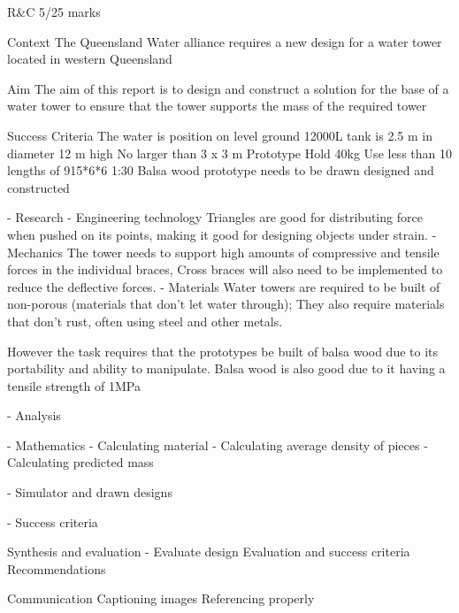 \documentclass[12pt,landscape]{article}
\begin{document}
R&C 5/25 marks

Context
The Queensland Water alliance requires a new design for a water tower located in western Queensland

Aim 
The aim of this report is to design and construct a solution for the base of a water tower to ensure that the tower supports the mass of the required tower

Success Criteria
The water is position on level ground
12000L tank is 2.5 m in diameter
12 m high
No larger than 3 x 3 m
Prototype
Hold 40kg 
Use less than 10 lengths of 915*6*6
1:30 Balsa wood prototype needs to be drawn designed and constructed

- Research
- Engineering technology 
Triangles are good for distributing force when pushed on its points, making it good for designing objects under strain.
- Mechanics 
The tower needs to support high amounts of compressive and tensile forces in the individual braces, Cross braces will also need to be implemented to reduce the deflective forces.
- Materials
Water towers are required to be built of non-porous (materials that don’t let water through); They also require materials that don’t rust, often using steel and other metals.

However the task requires that the prototypes be built of balsa wood due to its portability and ability to manipulate. 
Balsa wood is also good due to it having a tensile strength of 1MPa



- Analysis

- Mathematics
- Calculating material
- Calculating average density of pieces
- Calculating predicted mass

- Simulator and drawn designs

- Success criteria

Synthesis and evaluation 
- Evaluate design
Evaluation and success criteria
Recommendations

Communication 
Captioning images
Referencing properly
\end{document}
